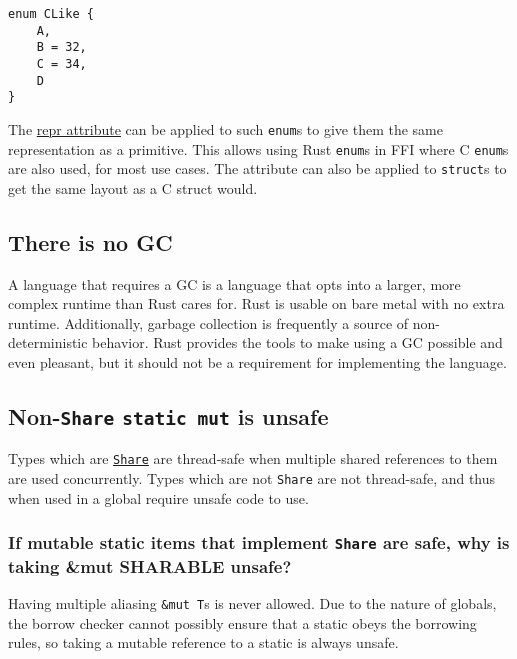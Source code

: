 \documentclass[]{article}
\begin{document}
\begin{verbatim}
enum CLike {
    A,
    B = 32,
    C = 34,
    D
}
\end{verbatim}

The
\href{http://doc.rust-lang.org/rust.html\#miscellaneous-attributes}{repr
attribute} can be applied to such \texttt{enum}s to give them the same
representation as a primitive. This allows using Rust \texttt{enum}s in
FFI where C \texttt{enum}s are also used, for most use cases. The
attribute can also be applied to \texttt{struct}s to get the same layout
as a C struct would.

\subsection{There is no GC}\label{there-is-no-gc}

A language that requires a GC is a language that opts into a larger,
more complex runtime than Rust cares for. Rust is usable on bare metal
with no extra runtime. Additionally, garbage collection is frequently a
source of non-deterministic behavior. Rust provides the tools to make
using a GC possible and even pleasant, but it should not be a
requirement for implementing the language.

\subsection{Non-\texttt{Share} \texttt{static mut} is
unsafe}\label{non-share-static-mut-is-unsafe}

Types which are
\href{http://doc.rust-lang.org/core/kinds/trait.Share.html}{\texttt{Share}}
are thread-safe when multiple shared references to them are used
concurrently. Types which are not \texttt{Share} are not thread-safe,
and thus when used in a global require unsafe code to use.

\subsubsection{If mutable static items that implement \texttt{Share} are
safe, why is taking \&mut SHARABLE
unsafe?}\label{if-mutable-static-items-that-implement-share-are-safe-why-is-taking-mut-sharable-unsafe}

Having multiple aliasing \texttt{\&mut T}s is never allowed. Due to the
nature of globals, the borrow checker cannot possibly ensure that a
static obeys the borrowing rules, so taking a mutable reference to a
static is always unsafe.
\end{document}
